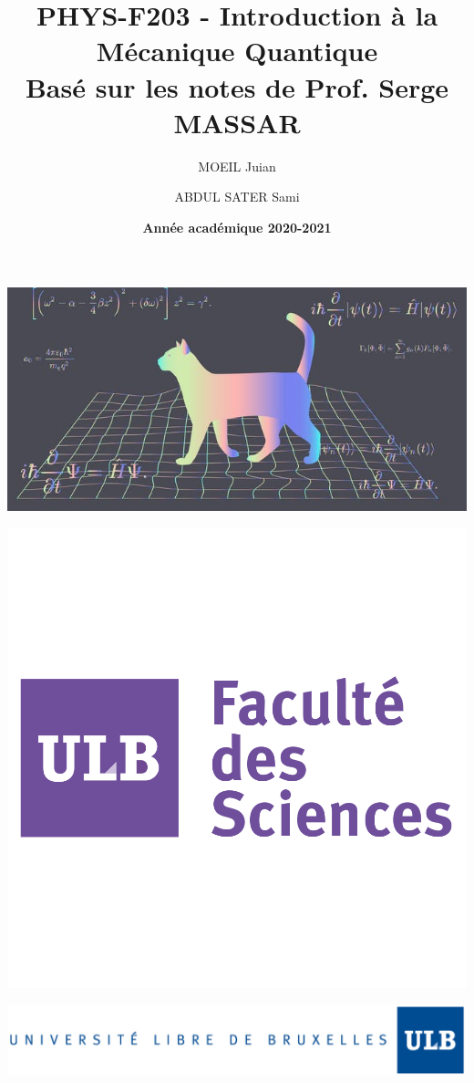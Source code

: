 \documentclass[a4paper]{article}
\title{\textbf{PHYS-F203 - Introduction à la Mécanique Quantique} \\ Basé sur les notes de Prof. Serge MASSAR}
\author{MOEIL Juian \and ABDUL SATER Sami}
\date{\textbf{Année académique 2020-2021}}
\numberwithin{equation}{part}
\begin{document}
\maketitle
\begin{center}
\includegraphics[scale=0.65]{Images/cat.jpg}
\end{center}
\begin{center}
\includegraphics[scale=0.20]{Images/sciences.png}
\end{center}
\begin{center}
\includegraphics[scale=0.45]{Images/ULB.jpg}
\end{center}
\end{document}

